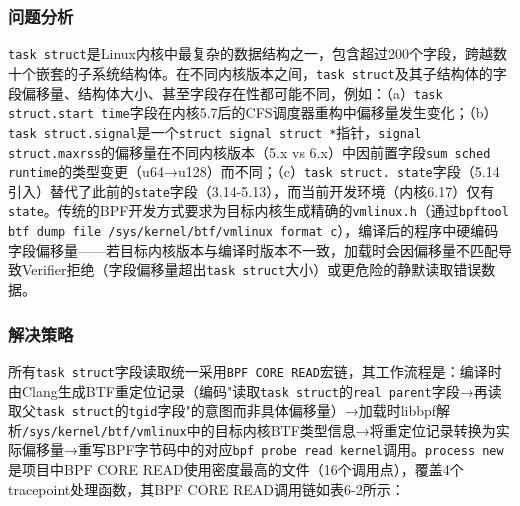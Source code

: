 \documentclass[a4paper]{ctexart}
\makeatletter
\renewcommand{\_}{%
  \ifmmode
    \nfss@text{\textunderscore}%
  \else
    \textunderscore\discretionary{}{}{}%
  \fi}
\makeatother
\begin{document}
\subsubsection{问题分析}



\texttt{task\_struct}是Linux内核中最复杂的数据结构之一，包含超过200个字段，跨越数十个嵌套的子系统结构体。在不同内核版本之间，\texttt{task\_struct}及其子结构体的字段偏移量、结构体大小、甚至字段存在性都可能不同，例如：（a）\texttt{task\_struct.start\_time}字段在内核5.7后的CFS调度器重构中偏移量发生变化；（b）\texttt{task\_struct.signal}是一个\texttt{struct signal\_struct *}指针，\texttt{signal\_struct.maxrss}的偏移量在不同内核版本（5.x vs 6.x）中因前置字段\texttt{sum\_sched\_runtime}的类型变更（u64→u128）而不同；（c）\texttt{task\_struct.\_\_state}字段（5.14引入）替代了此前的\texttt{state}字段（3.14-5.13），而当前开发环境（内核6.17）仅有\texttt{\_\_state}。传统的BPF开发方式要求为目标内核生成精确的\texttt{vmlinux.h}（通过\texttt{bpftool btf dump file /sys/kernel/btf/vmlinux format c}），编译后的程序中硬编码字段偏移量——若目标内核版本与编译时版本不一致，加载时会因偏移量不匹配导致Verifier拒绝（字段偏移量超出\texttt{task\_struct}大小）或更危险的静默读取错误数据。


\subsubsection{解决策略}



所有\texttt{task\_struct}字段读取统一采用\texttt{BPF\_CORE\_READ}宏链，其工作流程是：编译时由Clang生成BTF重定位记录（编码"读取\texttt{task\_struct}的\texttt{real\_parent}字段→再读取父\texttt{task\_struct}的\texttt{tgid}字段"的意图而非具体偏移量）→加载时libbpf解析\texttt{/sys/kernel/btf/vmlinux}中的目标内核BTF类型信息→将重定位记录转换为实际偏移量→重写BPF字节码中的对应\texttt{bpf\_probe\_read\_kernel}调用。\texttt{process\_new}是项目中BPF\_CORE\_READ使用密度最高的文件（16个调用点），覆盖4个tracepoint处理函数，其BPF\_CORE\_READ调用链如表6-2所示：
\end{document}
